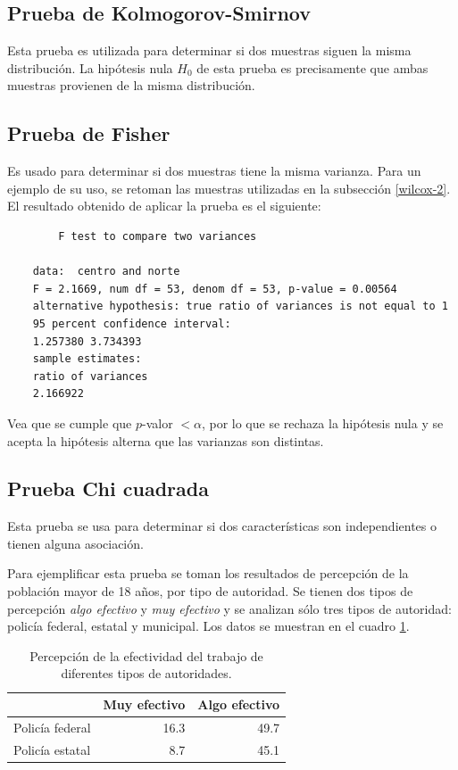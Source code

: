 \documentclass[12pt]{article}
\begin{document}
	\subsection{Prueba de Kolmogorov-Smirnov}
	
	Esta prueba es utilizada para determinar si dos muestras siguen la misma distribución. La hipótesis nula $H_0$ de esta prueba es precisamente que ambas muestras provienen de la misma distribución.
	
	\subsection{Prueba de Fisher}
	
	Es usado para determinar si dos muestras tiene la misma varianza. Para un ejemplo de su uso, se retoman las muestras utilizadas en la subsección \ref{wilcox-2}. El resultado obtenido de aplicar la prueba es el siguiente:
	\begin{verbatim}
		F test to compare two variances
	
	data:  centro and norte
	F = 2.1669, num df = 53, denom df = 53, p-value = 0.00564
	alternative hypothesis: true ratio of variances is not equal to 1
	95 percent confidence interval:
	1.257380 3.734393
	sample estimates:
	ratio of variances 
	2.166922 
	\end{verbatim}

	Vea que se cumple que $p$-valor $< \alpha$, por lo que se rechaza la hipótesis nula y se acepta la hipótesis alterna que las varianzas son distintas.
	
	\subsection{Prueba Chi cuadrada}
	
	Esta prueba se usa para determinar si dos características son independientes o tienen alguna asociación. 
	
	Para ejemplificar esta prueba se toman los resultados de percepción de la población mayor de 18 años, por tipo de autoridad. Se tienen dos tipos de percepción {\em algo efectivo} y {\em muy efectivo} y se analizan sólo tres tipos de autoridad: policía federal, estatal y municipal. Los datos se muestran en el cuadro \ref{dtaos-chi}.
	
	\begin{table}[b]
		\centering
		\caption{Percepción de la efectividad del trabajo de diferentes tipos de autoridades.}
		\label{dtaos-chi}
		\begin{tabular}{lrr}
			\hline
			 & Muy efectivo & Algo efectivo\\
			\hline
			Policía federal & 16.3 & 49.7 \\
			Policía estatal & 8.7 & 45.1 \\
			\hline
		\end{tabular}
	\end{table}
	
\end{document}
